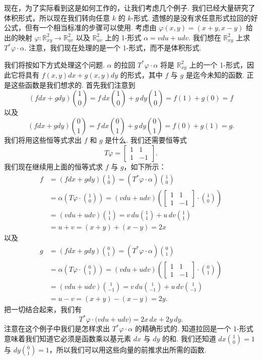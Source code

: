 现在，为了实际看到这是如何工作的，让我们考虑几个例子. 我们已经大量研究了体积形式，所以现在我们转向任意 $k$ 的 $k$-形式. 遗憾的是没有求任意形式拉回的好公式，但有一个相当标准的步骤可以使用. 考虑由 $\varphi(x,y)=(x+y,x-y)$ 给出的映射 $\varphi:\mathbb{R}^2_{xy}\to\mathbb{R}^2_{uv}$ 以及 $\mathbb{R}^2_{uv}$ 上的 1-形式 $\alpha=vdu+udv$. 我们想在 $\mathbb{R}^2_{xy}$ 上求 $T^*\varphi\cdot\alpha$. 注意，我们现在处理的是一个 1-形式，而不是体积形式.

我们将按如下方式处理这个问题. $\alpha$ 的拉回 $T^*\varphi\cdot\alpha$ 将是 $\mathbb{R}^2_{xy}$ 上的一个 1-形式，因此它将具有 $f(x,y)dx+g(x,y)dy$ 的形式，其中 $f$ 与 $g$ 是迄今未知的函数. 正是这些函数是我们想求的. 首先我们注意到
\[
(fdx+gdy)\binom{1}{0}=f\,dx\binom{1}{0}+g\,dy\binom{1}{0}=f(1)+g(0)=f
\]
以及
\[
(fdx+gdy)\binom{0}{1}=f\,dx\binom{0}{1}+g\,dy\binom{0}{1}=f(0)+g(1)=g.
\]
我们将用这些恒等式求出 $f$ 和 $g$ 是什么. 我们还需要恒等式
\[
T\varphi=
\begin{bmatrix}
1&1\\
1&-1
\end{bmatrix}.
\]
我们现在继续用上面的恒等式求 $f$ 与 $g$，如下所示：
\begin{align*}
f&=(fdx+gdy)\binom{1}{0}=(T^*\varphi\cdot\alpha)\binom{1}{0}\\
&=\alpha\left(T\varphi\cdot\binom{1}{0}\right)=(vdu+udv)\left(\begin{bmatrix}1&1\\1&-1\end{bmatrix}\cdot\binom{1}{0}\right)\\
&=(vdu+udv)\binom{1}{1}=v\,du\binom{1}{1}+u\,dv\binom{1}{1}\\
&=u+v=(x+y)+(x-y)=2x
\end{align*}
以及
\begin{align*}
g&=(fdx+gdy)\binom{0}{1}=(T^*\varphi\cdot\alpha)\binom{0}{1}\\
&=\alpha\left(T\varphi\cdot\binom{0}{1}\right)=(vdu+udv)\left(\begin{bmatrix}1&1\\1&-1\end{bmatrix}\cdot\binom{0}{1}\right)\\
&=(vdu+udv)\binom{1}{-1}=v\,du\binom{1}{-1}+u\,dv\binom{1}{-1}\\
&=u-v=(x+y)-(x-y)=2y.
\end{align*}
把一切结合起来，我们有
\[
T^*\varphi\cdot\bigl(vdu+udv\bigr)=2x\,dx+2y\,dy.
\]
注意在这个例子中我们是怎样求出 $T^*\varphi\cdot\alpha$ 的精确形式的. 知道拉回是一个 1-形式意味着我们知道它必须是函数乘以基元素 $dx$ 与 $dy$ 的和. 我们还知道 $dx\binom{1}{0}=1$ 与 $dy\binom{0}{1}=1$，所以我们可以用这些向量的前推求出所需的函数.


